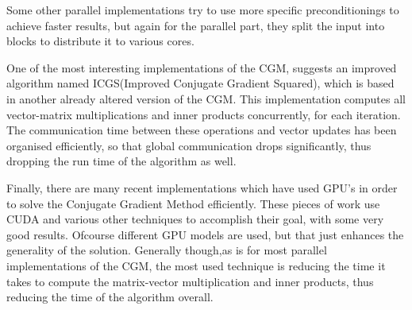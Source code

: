 \documentclass[12pt,a4paper]{article}
\begin{document}
Some other parallel implementations try to use more specific preconditionings to achieve faster results, but again for the parallel part, they split the input into blocks to distribute it to various cores\cite{adams1985m}\cite{adams1983m}. 

One of the most interesting implementations of the CGM, suggests an improved algorithm named ICGS(Improved Conjugate Gradient Squared), which is based in another already altered version of the CGM\cite{maheswaran1999mcgs}. This implementation computes all vector-matrix  multiplications and inner products concurrently, for each iteration. The communication time between these operations and vector updates has been organised efficiently, so that global communication drops significantly, thus dropping the run time of the algorithm as well\cite{yang2001improved}.

Finally, there are many recent implementations which have used GPU's in order to solve the Conjugate Gradient Method efficiently. These pieces of work use CUDA and various other techniques to accomplish their goal, with some very good results. Ofcourse different GPU models are used, but that just enhances the generality of the solution. Generally though,as is for most parallel implementations of the CGM, the most used technique is reducing the time it takes to compute the matrix-vector multiplication and inner products, thus reducing the time of the algorithm overall\cite{galiano2012gpu}\cite{wozniak2010parallel}.
\newpage


\cite{navaridas2009understanding}
\cite{sharp2012power}
\cite{davies2010interfacing}
\cite{sharp2011event}
\cite{gerstner2002spiking}
\cite{press2007numerical}
\cite{shewchuk1994introduction}
\cite{cgm2009lec}
\cite{o1987parallel}
\cite{adams1985m}
\cite{maheswaran1999mcgs}
\cite{yang2001improved}
\cite{adams1983m}
\cite{galiano2012gpu}
\cite{wozniak2010parallel}
\cite{hestenes1952methods}
\cite{rosenbloom1956method}
\cite{furber2007neural}
\cite{spinnweb}
\cite{khan2008spinnaker}
\end{document}
